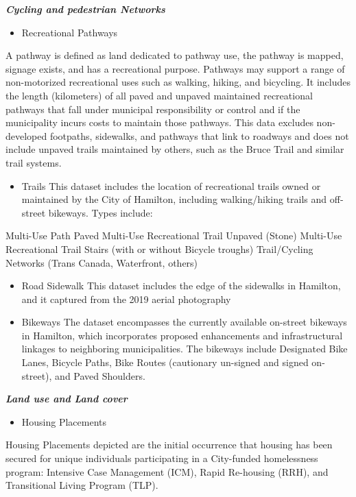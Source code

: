 \documentclass[12pt,twoside]{reedthesis}
\providecommand{\tightlist}{%
  \setlength{\itemsep}{0pt}\setlength{\parskip}{0pt}}
\begin{document}
\textbf{\emph{Cycling and pedestrian Networks}}
\begin{itemize}
\tightlist
\item
  Recreational Pathways
\end{itemize}
A pathway is defined as land dedicated to pathway use, the pathway is mapped, signage exists, and has a recreational purpose. Pathways may support a range of non-motorized recreational uses such as walking, hiking, and bicycling. It includes the length (kilometers) of all paved and unpaved maintained recreational pathways that fall under municipal responsibility or control and if the municipality incurs costs to maintain those pathways. This data excludes non-developed footpaths, sidewalks, and pathways that link to roadways and does not include unpaved trails maintained by others, such as the Bruce Trail and similar trail systems.
\begin{itemize}
\tightlist
\item
  Trails This dataset includes the location of recreational trails owned or maintained by the City of Hamilton, including walking/hiking trails and off-street bikeways. Types include:
\end{itemize}
Multi-Use Path Paved Multi-Use Recreational Trail Unpaved (Stone) Multi-Use Recreational Trail Stairs (with or without Bicycle troughs) Trail/Cycling Networks (Trans Canada, Waterfront, others)
\begin{itemize}
\item
  Road Sidewalk This dataset includes the edge of the sidewalks in Hamilton, and it captured from the 2019 aerial photography
\item
  Bikeways The dataset encompasses the currently available on-street bikeways in Hamilton, which incorporates proposed enhancements and infrastructural linkages to neighboring municipalities. The bikeways include Designated Bike Lanes, Bicycle Paths, Bike Routes (cautionary un-signed and signed on-street), and Paved Shoulders.
\end{itemize}
\textbf{\emph{Land use and Land cover}}
\begin{itemize}
\tightlist
\item
  Housing Placements
\end{itemize}
Housing Placements depicted are the initial occurrence that housing has been secured for unique individuals participating in a City-funded homelessness program: Intensive Case Management (ICM), Rapid Re-housing (RRH), and Transitional Living Program (TLP).
\end{document}
